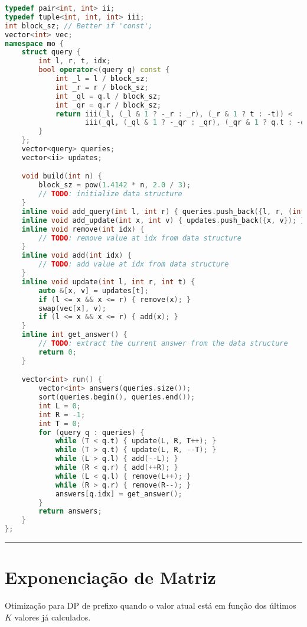 \documentclass[11pt, a4paper, twoside]{book}
\begin{document}
\begin{lstlisting}[language=C++]
typedef pair<int, int> ii;
typedef tuple<int, int, int> iii;
int block_sz; // Better if 'const';
vector<int> vec;
namespace mo {
    struct query {
        int l, r, t, idx;
        bool operator<(query q) const {
            int _l = l / block_sz;
            int _r = r / block_sz;
            int _ql = q.l / block_sz;
            int _qr = q.r / block_sz;
            return iii(_l, (_l & 1 ? -_r : _r), (_r & 1 ? t : -t)) <
                   iii(_ql, (_ql & 1 ? -_qr : _qr), (_qr & 1 ? q.t : -q.t));
        }
    };
    vector<query> queries;
    vector<ii> updates;

    void build(int n) {
        block_sz = pow(1.4142 * n, 2.0 / 3);
        // TODO: initialize data structure
    }
    inline void add_query(int l, int r) { queries.push_back({l, r, (int)updates.size(), (int)queries.size()}); }
    inline void add_update(int x, int v) { updates.push_back({x, v}); }
    inline void remove(int idx) {
        // TODO: remove value at idx from data structure
    }
    inline void add(int idx) {
        // TODO: add value at idx from data structure
    }
    inline void update(int l, int r, int t) {
        auto &[x, v] = updates[t];
        if (l <= x && x <= r) { remove(x); }
        swap(vec[x], v);
        if (l <= x && x <= r) { add(x); }
    }
    inline int get_answer() {
        // TODO: extract the current answer from the data structure
        return 0;
    }

    vector<int> run() {
        vector<int> answers(queries.size());
        sort(queries.begin(), queries.end());
        int L = 0;
        int R = -1;
        int T = 0;
        for (query q : queries) {
            while (T < q.t) { update(L, R, T++); }
            while (T > q.t) { update(L, R, --T); }
            while (L > q.l) { add(--L); }
            while (R < q.r) { add(++R); }
            while (L < q.l) { remove(L++); }
            while (R > q.r) { remove(R--); }
            answers[q.idx] = get_answer();
        }
        return answers;
    }
};
\end{lstlisting}

\hfill

\rule{\textwidth}{0.4pt}

\section{Exponenciação de Matriz}



Otimização para DP de prefixo quando o valor atual está em função dos últimos $K$ valores já calculados.   
\end{document}
